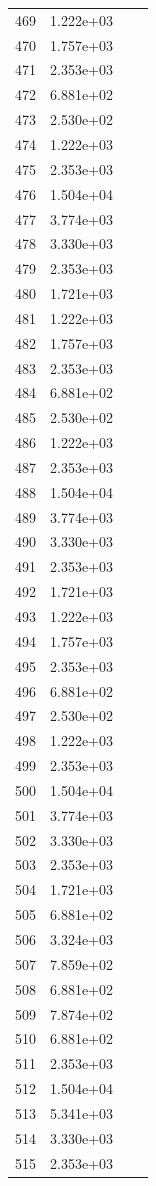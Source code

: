 \documentclass[12pt]{article}
\begin{document}
\begin{longtable}{@{}cccc@{}}
469 & 1.222e+03 &  &  \\
470 & 1.757e+03 &  &  \\
471 & 2.353e+03 &  &  \\
472 & 6.881e+02 &  &  \\
473 & 2.530e+02 &  &  \\
474 & 1.222e+03 &  &  \\
475 & 2.353e+03 &  &  \\
476 & 1.504e+04 &  &  \\
477 & 3.774e+03 &  &  \\
478 & 3.330e+03 &  &  \\
479 & 2.353e+03 &  &  \\
480 & 1.721e+03 &  &  \\
481 & 1.222e+03 &  &  \\
482 & 1.757e+03 &  &  \\
483 & 2.353e+03 &  &  \\
484 & 6.881e+02 &  &  \\
485 & 2.530e+02 &  &  \\
486 & 1.222e+03 &  &  \\
487 & 2.353e+03 &  &  \\
488 & 1.504e+04 &  &  \\
489 & 3.774e+03 &  &  \\
490 & 3.330e+03 &  &  \\
491 & 2.353e+03 &  &  \\
492 & 1.721e+03 &  &  \\
493 & 1.222e+03 &  &  \\
494 & 1.757e+03 &  &  \\
495 & 2.353e+03 &  &  \\
496 & 6.881e+02 &  &  \\
497 & 2.530e+02 &  &  \\
498 & 1.222e+03 &  &  \\
499 & 2.353e+03 &  &  \\
500 & 1.504e+04 &  &  \\
501 & 3.774e+03 &  &  \\
502 & 3.330e+03 &  &  \\
503 & 2.353e+03 &  &  \\
504 & 1.721e+03 &  &  \\
505 & 6.881e+02 &  &  \\
506 & 3.324e+03 &  &  \\
507 & 7.859e+02 &  &  \\
508 & 6.881e+02 &  &  \\
509 & 7.874e+02 &  &  \\
510 & 6.881e+02 &  &  \\
511 & 2.353e+03 &  &  \\
512 & 1.504e+04 &  &  \\
513 & 5.341e+03 &  &  \\
514 & 3.330e+03 &  &  \\
515 & 2.353e+03 &  &  \\

\bottomrule
\end{longtable}
\end{document}
